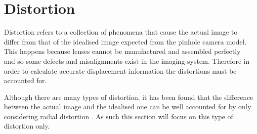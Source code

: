 \documentclass[12pt,oneside,openany,a4paper, %
english, %
masters-t, goldenblock]{usthesis}
\begin{document}

\section{Distortion}
\label{sec: distortion}
Distortion refers to a collection of phenomena that cause the actual image to differ from that of the idealised image expected from the pinhole camera model. This happens because lenses cannot be manufactured and assembled perfectly and so some defects and misalignments exist in the imaging system. Therefore in order to calculate accurate displacement information the distortions must be accounted for. %

Although there are many types of distortion, it has been found that the difference between the actual image and the idealised one can be well accounted for by only considering radial distortion \cite{tsai1987versatile,wei1994implicit}. As such this section will focus on this type of distortion only.
\end{document}
